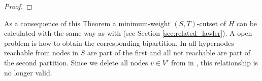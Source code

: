 \begin{proof}
%
%

\end{proof}

As a consequence of this Theorem a minimum-weight $(S,T)$-cutset of $H$ can be calculated with
 the same way as with  (see Section \ref{sec:related_lawler}). A open
problem is how to obtain the corresponding bipartition. In  all hypernodes
reachable from nodes in $S$ are part of the first and all not reachable are part of the
second partition. Since we delete all nodes $v \in V'$ from  in , this
relationship is no longer valid. 

